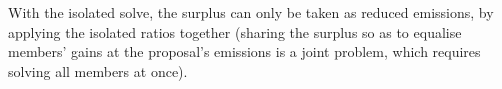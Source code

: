 \documentclass[12pt,english]{article}
\theoremstyle{remark}
\begin{document}
{%
With the isolated solve, the surplus can only be taken as reduced emissions, by applying the isolated ratios together (sharing the surplus so as to equalise members' gains at the proposal's emissions is a joint problem, which requires solving all members at once). %
}
\end{document}
